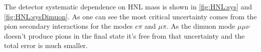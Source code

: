 \documentclass[../main.tex]{subfiles}
\begin{document}
\begin{comment}
The results of all the systematic study are presented in \autoref{tab:HNL:sys}.
\begin{table}[!ht]
\begin{center}
\begin{tabular}{|l |c| c| c|}
  \hline
   & $\mu\pi$ & $e\pi$ & $\mu\mu\nu$\\
  \hline
  \multicolumn{4}{||l|}{Variation-like} \\
  \hline
  B Field distortions                 & 0.48\%    & 0.37\%         &  0.02\%\\
  TPC momentum scale                  & 0.03\%    & 0.01\%         & 0.04\%\\
  TPC momentum resolution             & 2.34\%    & 0.78\%         & 0.46\%\\
  TPC PID                             & 0.41\%    & 0.75\%         & 1\%\\
  \hline
  \multicolumn{4}{||l|}{Efficiency-like} \\
  \hline
  TPC cluster efficiency              &   $\ll1\%$   &   $\ll1\%$  &  0.01\%\\
  TPC tracking efficiency             &   0.44\%     &  0.34 \%    & 0.46\% \\
  TPC charge ID efficiency            &   0.04\%     &   0.21\%    &   0.76\%\\
  TPC-FGD matching                    &   0.27\%     &    $\ll1\%$ & 0.03\%\\
  Pion secondary interactions         &   3.88\%     &   2.91\%    &  - \\
  Global vertex combining             &    0.58\%    &  0.52\%     & 0.48\%\\
  ECal PID                            &     -        &     -       & 0.27\%\\
  ECal TPC matching                   &     -        &     -       &  0.01\%\\
  \hline
  Total                               &   4.64\%     &  3.20\%     & 1.51\%\\
  \hline
\end{tabular}
\caption{Detector systematics summary.}
\label{tab:HNL:sys}
\end{center}
\end{table}
\end{comment}

The detector systematic dependence on HNL mass is shown in \autoref{fig:HNL:sys} and \autoref{fig:HNL:sysDimuon}. As one can see the most critical uncertainty comes from the pion secondary interactions for the modes $e\pi$ and $\mu\pi$. As the dimuon mode $\mu\mu\nu$ doesn't produce pions in the final state it's free from that uncertainty and the total error is much smaller.
\end{document}
